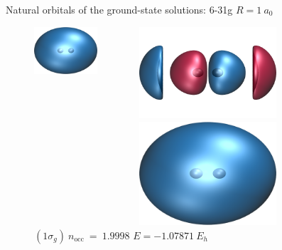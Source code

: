 \documentclass[10pt]{beamer}
\begin{document}
\begin{frame}{Natural orbitals of the ground-state solutions:  6-31g $R=1~a_0$}
\begin{figure}
\begin{columns}[b]
\begin{column}{0.31\textwidth}
        \caption*{\centering $(2\sigma_g)~n_\text{occ}~=~0.007$}
        \includegraphics[width=0.7\textwidth]{Figures/h2_HF_mo1.cube.png}
        \caption*{\centering $(1\sigma_g)~n_\text{occ}~=~1.993$
        $E=-1.08569~E_h$}
      \end{column}
      \pause[3]
      \begin{column}{0.31\textwidth}
        \includegraphics[width=0.7\textwidth]{Figures/h2_HF_mo4.cube.png}
        \caption*{\centering $(2\sigma_u)~n_\text{occ}~=~0.0002$}
        \includegraphics[width=0.7\textwidth]{Figures/h2_HF_mo1.cube.png}
        \caption*{\centering $(1\sigma_g)~n_\text{occ}~=~1.9998$
        $E=-1.07871~E_h$}
      \end{column}
      
    \end{columns}
  \end{figure}
\end{frame}
\end{document}
